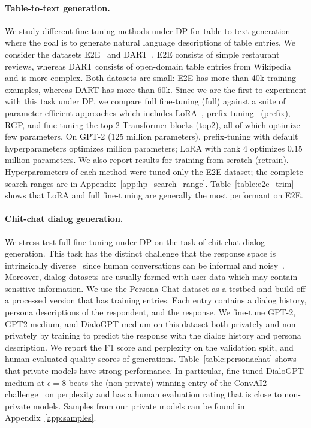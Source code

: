 \paragraph{Table-to-text generation.}
We study different fine-tuning methods under DP for table-to-text generation where the goal is to generate natural language descriptions of table entries. 
We consider the datasets E2E~\citep{novikova2017e2e} and DART~\citep{nan2020dart}. 
E2E consists of simple restaurant reviews, whereas DART consists of open-domain table entries from Wikipedia and is more complex. 
Both datasets are small: E2E has more than 40k training examples, whereas DART has more than 60k.
Since we are the first to experiment with this task under DP, we compare full fine-tuning (full) against a suite of parameter-efficient approaches which includes LoRA~\citep{hu2021lora}, prefix-tuning~\citep{li2021prefix} (prefix), RGP, and fine-tuning the top 2 Transformer blocks (top2), all of which optimize few parameters. 
On GPT-2 (125 million parameters), prefix-tuning with default hyperparameters optimizes  million parameters; LoRA with rank 4 optimizes \mytextapprox$0.15$  million parameters. 
We also report results for training from scratch (retrain).
Hyperparameters of each method were tuned only the E2E dataset; the complete search ranges are in Appendix~\ref{app:hp_search_range}.
Table~\ref{table:e2e_trim} shows that LoRA and full fine-tuning are generally the most performant on E2E. 


\paragraph{Chit-chat dialog generation.}
We stress-test full fine-tuning under DP on the task of chit-chat dialog generation. This task has the distinct challenge that the response space is intrinsically diverse~\citep{li2015diversity,gao2018neural} since human conversations can be informal and noisy~\citep{zhang2019dialogpt}.
Moreover, dialog datasets are usually formed with user data which may contain sensitive information.
We use the Persona-Chat dataset \citep{zhang2018personalizing} as a testbed and build off a processed version that has  training entries.
Each entry contains a dialog history, persona descriptions of the respondent, and the response. 
We fine-tune GPT-2, GPT2-medium, and DialoGPT-medium on this dataset both privately and non-privately by training to predict the response with the dialog history and persona description. 
We report the F1 score and perplexity on the validation split, and human evaluated quality scores of generations.
Table~\ref{table:personachat} shows that private models have strong performance. 
In particular, fine-tuned DialoGPT-medium at $\epsilon=8$ beats the (non-private) winning entry of the ConvAI2 challenge~\citep{dinan2019second} on perplexity and has a human evaluation rating that is close to non-private models.
Samples from our private models can be found in Appendix~\ref{app:samples}.


